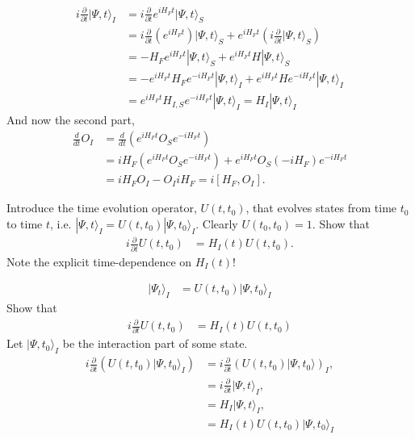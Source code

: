 \documentclass[working, oneside]{../../Preambles/tuftebook}
\begin{document}
\begin{solution}
\begin{align*}
i \frac{\partial}{\partial t} |\Psi, t\rangle_I &= i \frac{\partial}{\partial t} e^{i H_F t} |\Psi, t\rangle_S \\
&= i \frac{\partial}{\partial t} (e^{i H_F t}) |\Psi, t\rangle_S + e^{i H_F t} (i \frac{\partial}{\partial t} |\Psi, t\rangle_S) \\
&= -H_F e^{i H_F t} |\Psi, t\rangle_S + e^{i H_F t} H |\Psi, t\rangle_S \\
&= -e^{i H_F t} H_F e^{-i H_F t}|\Psi, t\rangle_I + e^{i H_F t} H e^{-i H_F t} |\Psi, t\rangle_I \\
&= e^{i H_F t} H_{I,S} e^{-i H_F t} |\Psi, t\rangle_I = H_I |\Psi, t\rangle_I
\end{align*}
And now the second part,
\begin{align*}
\frac{d}{dt} O_I &= \frac{d}{dt} (e^{i H_F t} O_S e^{-i H_F t}) \\
&= i H_F (e^{i H_F t} O_S e^{-i H_F t}) + e^{i H_F t} O_S (-i H_F) e^{-i H_F t} \\
&= i H_F O_I - O_I i H_F = i [H_F, O_I].
\end{align*}
\end{solution}
\begin{exercise}[2]
Introduce the time evolution operator, \( U(t, t_0) \), that evolves states from time \( t_0 \) to time \( t \), i.e. \( |\Psi, t\rangle_I = U(t, t_0) |\Psi, t_0\rangle_I \). Clearly \( U(t_0, t_0) = 1 \). Show that
\begin{align*}
i \frac{\partial}{\partial t} U(t, t_0)
&= H_I(t) U(t, t_0). \tag{49}
\end{align*}
Note the explicit time-dependence on \( H_I(t) \)!
\end{exercise}
\begin{solution}
\begin{align*}
|\Psi_t\rangle_I
&= U(t, t_0) |\Psi, t_0\rangle_I
\end{align*}
Show that
\begin{align*}
i \frac{\partial}{\partial t} U(t, t_0)
&= H_I(t) U(t, t_0)
\end{align*}
Let \( |\Psi, t_0\rangle_I \) be the interaction part of some state.
\begin{align*}
i \frac{\partial}{\partial t} (U(t, t_0) |\Psi, t_0\rangle_I)
&= i \frac{\partial}{\partial t} (U(t, t_0) |\Psi, t_0\rangle)_I, \\
&= i \frac{\partial}{\partial t} |\Psi, t\rangle_I, \\
&= H_I |\Psi, t\rangle_I, \\
&= H_I(t) U(t, t_0) |\Psi, t_0\rangle_I
\end{align*}
\end{solution}
\end{document}
